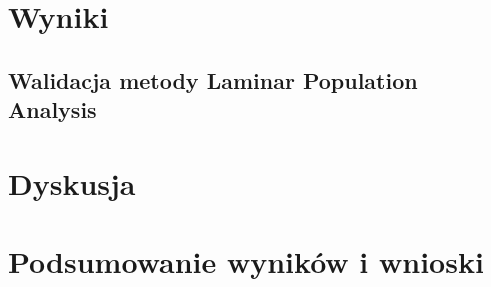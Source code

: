 \documentclass[a4paper,12pt,polish]{book}
\begin{document}
\chapter{Wyniki}
\section{Walidacja metody Laminar Population Analysis}

\chapter{Dyskusja}

\chapter{Podsumowanie wyników i wnioski}






\end{document}
